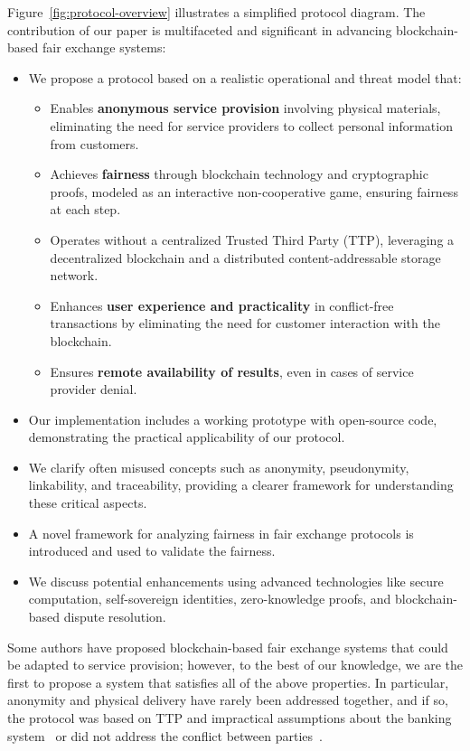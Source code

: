\documentclass[pdftex,twocolumn,epjc3]{svjour3}
\begin{document}
\begin{sloppypar}
Figure~\ref{fig:protocol-overview} illustrates a simplified protocol diagram. The contribution of our paper is multifaceted and significant in advancing blockchain-based fair exchange systems:
\begin{itemize}
  \item We propose a protocol based on a realistic operational and threat model that:
  \begin{itemize}
    \item Enables \textbf{anonymous service provision} involving physical materials, eliminating the need for service providers to collect personal information from customers.
    \item Achieves \textbf{fairness} through blockchain technology and cryptographic proofs, modeled as an interactive non-cooperative game, ensuring fairness at each step.
    \item Operates without a centralized Trusted Third Party (TTP), leveraging a decentralized blockchain and a distributed content-addressable storage network.
    \item Enhances \textbf{user experience and practicality} in conflict-free transactions by eliminating the need for customer interaction with the blockchain.
    \item Ensures \textbf{remote availability of results}, even in cases of service provider denial.
  \end{itemize}
  \item Our implementation includes a working prototype with open-source code, demonstrating the practical applicability of our protocol.
  \item We clarify often misused concepts such as anonymity, pseudonymity, linkability, and traceability, providing a clearer framework for understanding these critical aspects.
  \item A novel framework for analyzing fairness in fair exchange protocols is introduced and used to validate the fairness.
  \item We discuss potential enhancements using advanced technologies like secure computation, self-sovereign identities, zero-knowledge proofs, and blockchain-based dispute resolution.
\end{itemize}
Some authors have proposed blockchain-based fair exchange systems that could be adapted to service provision; however, to the best of our knowledge, we are the first to propose a system that satisfies all of the above properties. In particular, anonymity and physical delivery have rarely been addressed together, and if so, the protocol was based on TTP and impractical assumptions about the banking system~\cite{birjoveanuAnonymityFairexchangeEcommerce2015} or did not address the conflict between parties~\cite{altawyLelantosBlockchainBasedAnonymous2017}.
\end{sloppypar}
\end{document}
